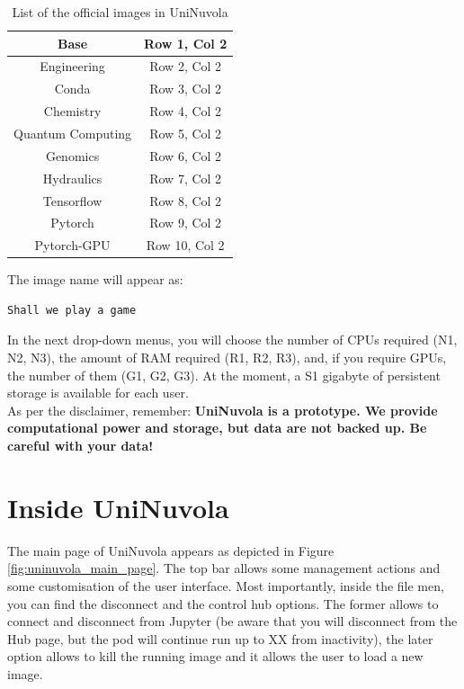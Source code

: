 \documentclass[a4paper,11pt]{article}
\begin{document}
\begin{table}[]
\caption{List of the official images in UniNuvola}
\label{tab:images}
\centering
\begin{tabular}{|c|c|}
\hline
Base & Row 1, Col 2 \\ \hline
Engineering & Row 2, Col 2 \\ \hline
Conda & Row 3, Col 2 \\ \hline
Chemistry & Row 4, Col 2 \\ \hline
Quantum Computing & Row 5, Col 2 \\ \hline
Genomics & Row 6, Col 2 \\ \hline
Hydraulics & Row 7, Col 2 \\ \hline
Tensorflow & Row 8, Col 2 \\ \hline
Pytorch & Row 9, Col 2 \\ \hline
Pytorch-GPU & Row 10, Col 2 \\ \hline
\end{tabular}
\end{table}


The image name will appear as: 
\begin{lstlisting}[language=bash] 
Shall we play a game
\end{lstlisting}

In the next drop-down menus, you will choose the number of CPUs required (N1, N2, N3), the amount of RAM required (R1, R2, R3), and, if you require GPUs, the number of them (G1, G2, G3). At the moment,  a S1 gigabyte of persistent storage is available for each user.\\

As per the disclaimer, remember: \textbf{UniNuvola is a prototype. We provide computational power and storage, but data are not backed up. Be careful with your data!} \\

\section{Inside UniNuvola}
The main page of UniNuvola appears as depicted in Figure \ref{fig:uninuvola_main_page}. The top bar allows some management actions and some customisation of the user interface. Most importantly, inside the file men, you can find the disconnect and  the control hub options. The former allows to connect and disconnect from Jupyter (be aware that you will disconnect from the Hub page, but the pod will continue run up to XX from inactivity), the later option allows to kill the running image and it allows the user to load a new image. \\ 
\end{document}
